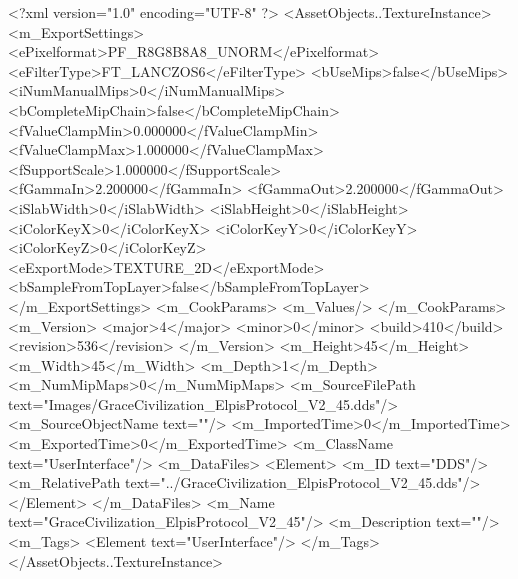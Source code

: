 <?xml version="1.0" encoding="UTF-8" ?>
<AssetObjects..TextureInstance>
	<m_ExportSettings>
		<ePixelformat>PF_R8G8B8A8_UNORM</ePixelformat>
		<eFilterType>FT_LANCZOS6</eFilterType>
		<bUseMips>false</bUseMips>
		<iNumManualMips>0</iNumManualMips>
		<bCompleteMipChain>false</bCompleteMipChain>
		<fValueClampMin>0.000000</fValueClampMin>
		<fValueClampMax>1.000000</fValueClampMax>
		<fSupportScale>1.000000</fSupportScale>
		<fGammaIn>2.200000</fGammaIn>
		<fGammaOut>2.200000</fGammaOut>
		<iSlabWidth>0</iSlabWidth>
		<iSlabHeight>0</iSlabHeight>
		<iColorKeyX>0</iColorKeyX>
		<iColorKeyY>0</iColorKeyY>
		<iColorKeyZ>0</iColorKeyZ>
		<eExportMode>TEXTURE_2D</eExportMode>
		<bSampleFromTopLayer>false</bSampleFromTopLayer>
	</m_ExportSettings>
	<m_CookParams>
		<m_Values/>
	</m_CookParams>
	<m_Version>
		<major>4</major>
		<minor>0</minor>
		<build>410</build>
		<revision>536</revision>
	</m_Version>
	<m_Height>45</m_Height>
	<m_Width>45</m_Width>
	<m_Depth>1</m_Depth>
	<m_NumMipMaps>0</m_NumMipMaps>
	<m_SourceFilePath text="Images/GraceCivilization_ElpisProtocol_V2_45.dds"/>
	<m_SourceObjectName text=""/>
	<m_ImportedTime>0</m_ImportedTime>
	<m_ExportedTime>0</m_ExportedTime>
	<m_ClassName text="UserInterface"/>
	<m_DataFiles>
		<Element>
			<m_ID text="DDS"/>
			<m_RelativePath text="../GraceCivilization_ElpisProtocol_V2_45.dds"/>
		</Element>
	</m_DataFiles>
	<m_Name text="GraceCivilization_ElpisProtocol_V2_45"/>
	<m_Description text=""/>
	<m_Tags>
		<Element text="UserInterface"/>
	</m_Tags>
</AssetObjects..TextureInstance>
